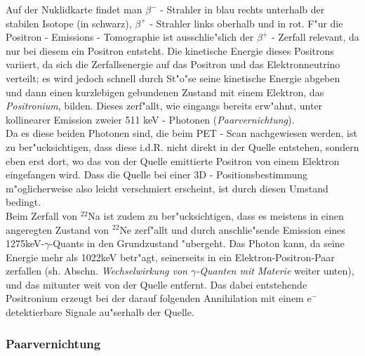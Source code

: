 \documentclass{article}
\begin{document}
Auf der Nuklidkarte findet man $\beta^-$ - Strahler in blau rechts unterhalb der stabilen Isotope (in schwarz), $\beta^+$ - Strahler links oberhalb und in rot.
F"ur die Positron - Emissions - Tomographie ist ausschlie"slich der $\beta^+$ - Zerfall relevant, da nur bei diesem ein Positron entsteht. Die kinetische Energie dieses Positrons variiert, da sich die Zerfallsenergie auf das Positron und das Elektronneutrino verteilt; es wird jedoch schnell durch St"o"se seine kinetische Energie abgeben und dann einen kurzlebigen gebundenen Zustand mit einem Elektron, das \textit{Positronium}, bilden. Dieses zerf"allt, wie eingangs bereits erw"ahnt, unter kollinearer Emission zweier 511 keV - Photonen (\textit{Paarvernichtung}).\\
Da es diese beiden Photonen sind, die beim PET - Scan nachgewiesen werden, ist zu ber"ucksichtigen, dass diese i.d.R. nicht direkt in der Quelle entstehen, sondern eben erst dort, wo das von der Quelle emittierte Positron von einem Elektron eingefangen wird. Dass die Quelle bei einer 3D - Positionsbestimmung m"oglicherweise also leicht verschmiert erscheint, ist durch diesen Umstand bedingt.\\
Beim Zerfall von $^{22}$Na ist zudem zu ber"ucksichtigen, dass es meistens in einen angeregten Zustand von $^{22}$Ne zerf"allt und durch anschlie"sende Emission eines 1275keV-$\gamma$-Quants in den Grundzustand "ubergeht. Das Photon kann, da seine Energie mehr als 1022keV betr"agt, seinerseits in ein Elektron-Positron-Paar zerfallen (sh. Abschn. \textit{Wechselwirkung von $\gamma$-Quanten mit Materie} weiter unten), und das mitunter weit von der Quelle entfernt. Das dabei entstehende Positronium erzeugt bei der darauf folgenden Annihilation mit einem e$^-$ detektierbare Signale au"serhalb der Quelle.




\subsubsection{Paarvernichtung}
\end{document}
